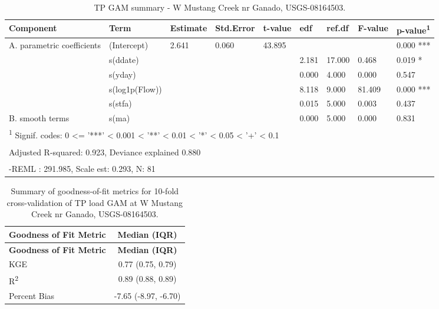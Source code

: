 \documentclass[
]{article}
\newenvironment{widestuff}{\begin{table}[h]\begin{adjustwidth}{-4.5cm}{-4.5cm}\centering}{\end{adjustwidth}\end{table}}
\begin{document}
\begin{widestuff}

\caption{TP GAM summary - W Mustang Creek nr Ganado, USGS-08164503.}
\centering
\begin{tabular}[t]{lllllllll}
\toprule
Component & Term & Estimate & Std.Error & t-value & edf & ref.df & F-value & p-value\textsuperscript{1}\\
\midrule
A. parametric coefficients & (Intercept) & 2.641 & 0.060 & 43.895 &  &  &  & 0.000 ***\\
\cmidrule{1-9}
 & s(ddate) &  &  &  & 2.181 & 17.000 & 0.468 & 0.019 *\\

 & s(yday) &  &  &  & 0.000 & 4.000 & 0.000 & 0.547\\

 & s(log1p(Flow)) &  &  &  & 8.118 & 9.000 & 81.409 & 0.000 ***\\

 & s(stfa) &  &  &  & 0.015 & 5.000 & 0.003 & 0.437\\

\multirow[t]{-5}{*}{\raggedright\arraybackslash B. smooth terms} & s(ma) &  &  &  & 0.000 & 5.000 & 0.000 & 0.831\\
\bottomrule
\multicolumn{9}{l}{\textsuperscript{1} Signif. codes: 0 <= '***' < 0.001 < '**' < 0.01 < '*' < 0.05 < '+' < 0.1}\\
\multicolumn{9}{l}{\textsuperscript{} Adjusted R-squared: 0.923, Deviance explained 0.880}\\
\multicolumn{9}{l}{\textsuperscript{} -REML : 291.985, Scale est: 0.293, N: 81}\\
\end{tabular}
\end{widestuff}

\hypertarget{tbl-TP08164503-CV}{}
\begin{longtable}[]{@{}lc@{}}
\caption{\label{tbl-TP08164503-CV}Summary of goodness-of-fit metrics for
10-fold cross-validation of TP load GAM at W Mustang Creek nr Ganado,
USGS-08164503.}\tabularnewline
\toprule()
\textbf{Goodness of Fit Metric} & \textbf{Median (IQR)} \\
\midrule()
\endfirsthead
\toprule()
\textbf{Goodness of Fit Metric} & \textbf{Median (IQR)} \\
\midrule()
\endhead
KGE & 0.77 (0.75, 0.79) \\
R\textsuperscript{2} & 0.89 (0.88, 0.89) \\
Percent Bias & -7.65 (-8.97, -6.70) \\
\bottomrule()
\end{longtable}
\end{document}

